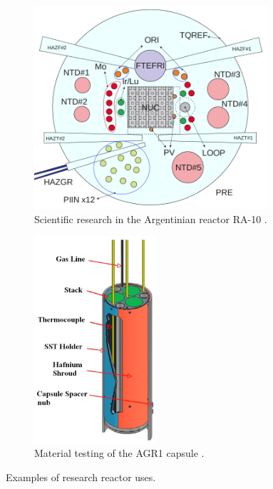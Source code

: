 \begin{figure}[!htbp] %
  \centering
  \begin{subfigure}[b]{0.49\textwidth}
    \centering
    \includegraphics[width=0.95\textwidth]{figures/RA-10}
    \caption{Scientific research in the Argentinian reactor RA-10 \cite{ra10}.}
  \end{subfigure}
  \hfill
  \begin{subfigure}[b]{0.49\textwidth}
    \centering
    \includegraphics[width=0.50\textwidth]{figures/agr1}
    \caption{Material testing of the \gls*{AGR1} capsule \cite{sterbentz_agr1_2018}.}
  \end{subfigure}
  \hfill
  \caption{Examples of research reactor uses.}
  \label{fig:intro-1}
\end{figure}

